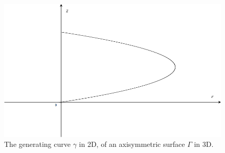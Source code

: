 \documentclass[12pt,letterpaper]{article}
\begin{document}
\begin{figure}[!ht]
\begin{center}
\includegraphics[scale=0.4]{2dcurve}
\end{center}
\caption{The generating curve $\gamma$ in 2D, of an axisymmetric surface $\Gamma$ in 3D.}
\end{figure}
\end{document}
